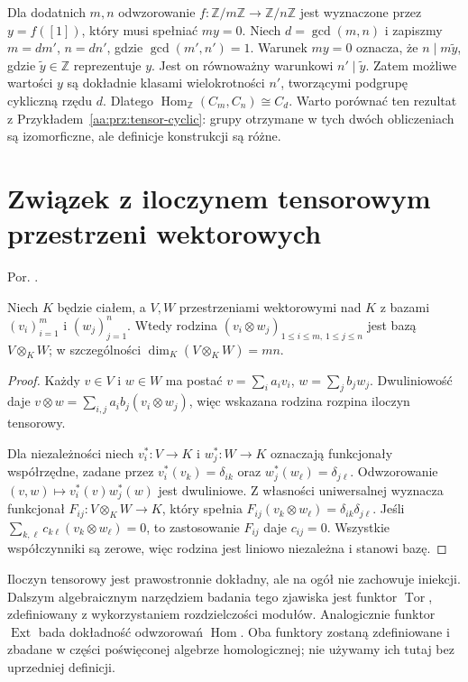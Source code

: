 \begin{przyklad}
Dla dodatnich $m,n$ odwzorowanie
$f:\mathbb Z/m\mathbb Z\to\mathbb Z/n\mathbb Z$
jest wyznaczone przez $y=f([1])$, który musi spełniać
$my=0$. Niech $d=\gcd(m,n)$ i zapiszmy $m=dm'$, $n=dn'$,
gdzie $\gcd(m',n')=1$. Warunek $my=0$ oznacza,
że $n\mid m\widetilde y$, gdzie $\widetilde y\in\mathbb Z$
reprezentuje $y$. Jest on równoważny warunkowi
$n'\mid\widetilde y$. Zatem możliwe wartości $y$
są dokładnie klasami wielokrotności $n'$, tworzącymi
podgrupę cykliczną rzędu $d$. Dlatego
$\operatorname{Hom}_{\mathbb Z}(C_m,C_n)\cong C_d$.
Warto porównać ten rezultat z
Przykładem~\ref{aa:prz:tensor-cyclic}:
grupy otrzymane w tych dwóch obliczeniach
są izomorficzne, ale definicje konstrukcji są różne.
\end{przyklad}

\section{Związek z iloczynem tensorowym przestrzeni wektorowych}
Por. .

\begin{stwierdzenie}
\label{aa:st:tensor-vspace-dimension}
Niech $K$ będzie ciałem, a $V,W$ przestrzeniami wektorowymi
nad $K$ z bazami $(v_i)_{i=1}^m$ i $(w_j)_{j=1}^n$.
Wtedy rodzina $(v_i\otimes w_j)_{1\le i\le m,\,1\le j\le n}$
jest bazą $V\otimes_KW$; w szczególności
$\dim_K(V\otimes_KW)=mn$.
\end{stwierdzenie}
\begin{proof}
Każdy $v\in V$ i $w\in W$ ma postać
$v=\sum_i a_iv_i$, $w=\sum_j b_jw_j$.
Dwuliniowość daje
$v\otimes w=\sum_{i,j}a_ib_j(v_i\otimes w_j)$,
więc wskazana rodzina rozpina iloczyn tensorowy.

Dla niezależności niech $v_i^*:V\to K$ i
$w_j^*:W\to K$ oznaczają funkcjonały współrzędne,
zadane przez $v_i^*(v_k)=\delta_{ik}$ oraz
$w_j^*(w_\ell)=\delta_{j\ell}$.
Odwzorowanie $(v,w)\mapsto v_i^*(v)w_j^*(w)$
jest dwuliniowe. Z własności uniwersalnej wyznacza
funkcjonał $F_{ij}:V\otimes_KW\to K$, który
spełnia $F_{ij}(v_k\otimes w_\ell)=\delta_{ik}\delta_{j\ell}$.
Jeśli $\sum_{k,\ell}c_{k\ell}(v_k\otimes w_\ell)=0$,
to zastosowanie $F_{ij}$ daje $c_{ij}=0$.
Wszystkie współczynniki są zerowe, więc rodzina jest
liniowo niezależna i stanowi bazę.
\end{proof}

\begin{uwaga}[Co dalej?]
Iloczyn tensorowy jest prawostronnie dokładny, ale na ogół
nie zachowuje iniekcji. Dalszym algebraicznym narzędziem
badania tego zjawiska jest funktor $\operatorname{Tor}$,
zdefiniowany z wykorzystaniem rozdzielczości modułów.
Analogicznie funktor $\operatorname{Ext}$ bada dokładność
odwzorowań $\operatorname{Hom}$. Oba funktory zostaną
zdefiniowane i zbadane w części poświęconej algebrze
homologicznej; nie używamy ich tutaj bez uprzedniej definicji.
\end{uwaga}

